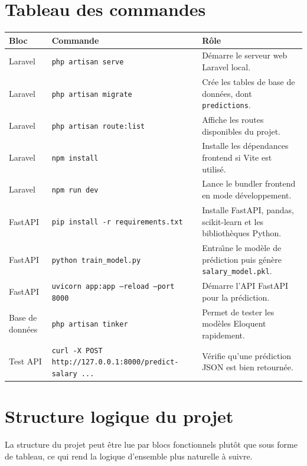 \documentclass[11pt,a4paper]{article}
\begin{document}
\section{Tableau des commandes}
\renewcommand{\arraystretch}{1.4}
\begin{longtable}{p{3.5cm}p{4.5cm}p{7cm}}
\toprule
\textbf{Bloc} & \textbf{Commande} & \textbf{R\^ole} \\
\midrule
\endhead
Laravel & \texttt{php artisan serve} & D\'emarre le serveur web Laravel local. \\
Laravel & \texttt{php artisan migrate} & Cr\'ee les tables de base de donn\'ees, dont \texttt{predictions}. \\
Laravel & \texttt{php artisan route:list} & Affiche les routes disponibles du projet. \\
Laravel & \texttt{npm install} & Installe les d\'ependances frontend si Vite est utilis\'e. \\
Laravel & \texttt{npm run dev} & Lance le bundler frontend en mode d\'eveloppement. \\
FastAPI & \texttt{pip install -r requirements.txt} & Installe FastAPI, pandas, scikit-learn et les biblioth\`eques Python. \\
FastAPI & \texttt{python train\_model.py} & Entra\^\i ne le mod\`ele de pr\'ediction puis g\'en\`ere \texttt{salary\_model.pkl}. \\
FastAPI & \texttt{uvicorn app:app --reload --port 8000} & D\'emarre l'API FastAPI pour la pr\'ediction. \\
Base de donn\'ees & \texttt{php artisan tinker} & Permet de tester les mod\`eles Eloquent rapidement. \\
Test API & \texttt{curl -X POST http://127.0.0.1:8000/predict-salary ...} & V\'erifie qu'une pr\'ediction JSON est bien retourn\'ee. \\
\bottomrule
\end{longtable}

\section{Structure logique du projet}
La structure du projet peut \^etre lue par blocs fonctionnels plut\^ot que sous forme de tableau, ce qui rend la logique d'ensemble plus naturelle \`a suivre.
\end{document}

